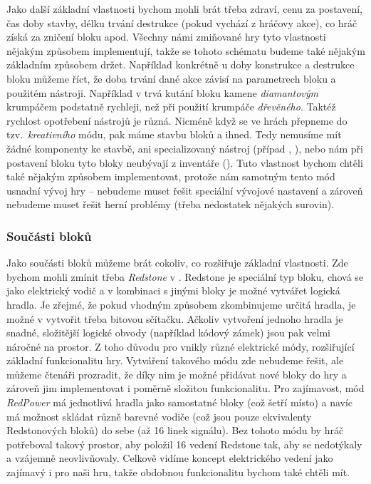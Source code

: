 Jako další základní vlastnosti bychom mohli brát třeba zdraví, cenu za postavení, čas doby stavby, délku trvání destrukce (pokud vychází z hráčovy akce), co hráč získá za zničení bloku apod. Všechny námi zmiňované hry tyto vlastnosti nějakým způsobem implementují, takže se tohoto schématu budeme také nějakým základním způsobem držet. Například konkrétně u doby konstrukce a destrukce bloku můžeme říct, že doba trvání dané akce závisí na parametrech bloku a použitém nástroji. Například v  trvá kutání bloku kamene \textit{diamantovým} krumpáčem podstatně rychleji, než při použití krumpáče \textit{dřevěného}. Taktéž rychlost opotřebení nástrojů je různá. Nicméně když se ve hrách přepneme do tzv.~\textit{kreativního} módu, pak máme stavbu bloků  a ihned. Tedy nemusíme mít žádné komponenty ke stavbě, ani specializovaný nástroj (případ \SE{}, \ME{}), nebo nám při postavení bloku tyto bloky neubývají z inventáře (\MC{}). Tuto vlastnost bychom chtěli také nějakým způsobem implementovat, protože nám samotným tento mód usnadní vývoj hry -- nebudeme muset řešit speciální vývojové nastavení a zároveň nebudeme muset řešit herní problémy (třeba nedostatek nějakých surovin). 

\subsubsection{Součásti bloků}
Jako součásti bloků můžeme brát cokoliv, co rozšiřuje základní vlastnosti. Zde bychom mohli zmínit třeba \textit{Redstone} v . Redstone je speciální typ bloku, chová se jako elektrický vodič a v kombinaci s jinými bloky je možné vytvářet logická hradla. Je zřejmé, že pokud vhodným způsobem zkombinujeme určitá hradla, je možné v  vytvořit třeba bitovou sčítačku. Ačkoliv vytvoření jednoho hradla je snadné, složitější logické obvody (například kódový zámek) jsou pak velmi náročné na prostor. Z toho důvodu pro \MC{} vnikly různé elektrické módy, rozšiřující základní funkcionalitu hry. Vytváření takového módu zde nebudeme řešit, ale můžeme čtenáři prozradit, že díky nim je možné přidávat nové bloky do hry a zároveň jim implementovat i poměrně složitou funkcionalitu. Pro zajímavost, mód \textit{RedPower} má jednotlivá hradla jako samostatné bloky (což šetří místo) a navíc má možnost skládat různě barevné vodiče (což jsou pouze ekvivalenty Redstonových bloků) do sebe (až 16 linek signálu). Bez tohoto módu by hráč potřeboval takový prostor, aby položil 16 vedení Redstone tak, aby se nedotýkaly a vzájemně neovlivňovaly. Celkově vidíme koncept elektrického vedení jako zajímavý i pro naši hru, takže obdobnou funkcionalitu bychom také chtěli mít.

